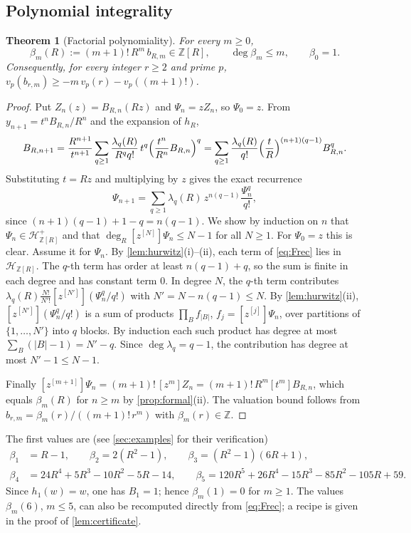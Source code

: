 \documentclass[11pt,reqno]{amsart}
\newtheorem{theorem}{Theorem}[section]
\theoremstyle{definition}
\theoremstyle{remark}
\theoremstyle{plain}
\newcommand{\Z}{\mathbb Z}
\newcommand{\Hur}{\mathcal H}
\newcommand{\hc}[1]{[z^{[#1]}]}
\begin{document}
\subsection{Polynomial integrality}

\begin{theorem}[Factorial polynomiality]\label{thm:beta}
For every $m\ge0$,
\[
\beta_m(R):=(m+1)!\,R^m\,b_{R,m}\in\Z[R],\qquad \deg\beta_m\le m,\qquad \beta_0=1 .
\]
Consequently, for every integer $r\ge2$ and prime $p$, $v_p(b_{r,m})\ge-m\,v_p(r)-v_p((m+1)!)$.
\end{theorem}

\begin{proof}
Put $Z_n(z)=B_{R,n}(Rz)$ and $\Psi_n=zZ_n$, so $\Psi_0=z$. From $y_{n+1}=t^nB_{R,n}/R^n$ and the expansion of $h_R$,
\[
B_{R,n+1}=\frac{R^{n+1}}{t^{n+1}}\sum_{q\ge1}\frac{\lambda_q(R)}{R^qq!}\,t^q\Bigl(\frac{t^n}{R^n}B_{R,n}\Bigr)^q
=\sum_{q\ge1}\frac{\lambda_q(R)}{q!}\Bigl(\frac tR\Bigr)^{(n+1)(q-1)}B_{R,n}^q .
\]
Substituting $t=Rz$ and multiplying by $z$ gives the exact recurrence
\begin{equation}\label{eq:Frec}
\Psi_{n+1}=\sum_{q\ge1}\lambda_q(R)\,z^{n(q-1)}\frac{\Psi_n^q}{q!},
\end{equation}
since $(n+1)(q-1)+1-q=n(q-1)$. We show by induction on $n$ that $\Psi_n\in\Hur^+_{\Z[R]}$ and that $\deg_R\hc N\Psi_n\le N-1$ for all $N\ge1$. For $\Psi_0=z$ this is clear. Assume it for $\Psi_n$. By \cref{lem:hurwitz}(i)--(ii), each term of \eqref{eq:Frec} lies in $\Hur_{\Z[R]}$. The $q$-th term has order at least $n(q-1)+q$, so the sum is finite in each degree and has constant term $0$. In degree $N$, the $q$-th term contributes $\lambda_q(R)\frac{N!}{N'!}\hc{N'}(\Psi_n^q/q!)$ with $N'=N-n(q-1)\le N$. By \cref{lem:hurwitz}(ii), $\hc{N'}(\Psi_n^q/q!)$ is a sum of products $\prod_{B}f_{|B|}$, $f_j=\hc j\Psi_n$, over partitions of $\{1,\dots,N'\}$ into $q$ blocks. By induction each such product has degree at most $\sum_B(|B|-1)=N'-q$. Since $\deg\lambda_q=q-1$, the contribution has degree at most $N'-1\le N-1$.

Finally $\hc{m+1}\Psi_n=(m+1)!\,[z^m]Z_n=(m+1)!\,R^m[t^m]B_{R,n}$, which equals $\beta_m(R)$ for $n\ge m$ by \cref{prop:formal}(ii). The valuation bound follows from $b_{r,m}=\beta_m(r)/((m+1)!\,r^m)$ with $\beta_m(r)\in\Z$.
\end{proof}

The first values are (see \cref{sec:examples} for their verification)
\begin{equation}\label{eq:betas}
\begin{aligned}
\beta_1&=R-1,\qquad \beta_2=2(R^2-1),\qquad \beta_3=(R^2-1)(6R+1),\\
\beta_4&=24R^4+5R^3-10R^2-5R-14,\qquad
\beta_5=120R^5+26R^4-15R^3-85R^2-105R+59 .
\end{aligned}
\end{equation}
Since $h_1(w)=w$, one has $B_1=1$; hence $\beta_m(1)=0$ for $m\ge1$. The values $\beta_m(6)$, $m\le5$, can also be recomputed directly from \eqref{eq:Frec}; a recipe is given in the proof of \cref{lem:certificate}.
\end{document}
